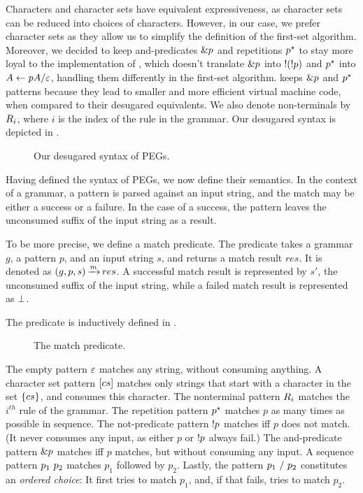 Characters and character sets
have equivalent expressiveness,
as character sets can be reduced into choices of characters.
However, in our case, we prefer character sets as they allow us to
simplify the definition of the first-set algorithm.
Moreover, we decided to keep and-predicates $\&p$
and repetitions $p^\star$
to stay more loyal to the implementation of \lpeg{},
which doesn't translate $\&p$ into $!(!p)$
and $p^\star$ into $A \leftarrow pA/\varepsilon{}$,
handling them differently in the first-set algorithm.
\lpeg{} keeps $\&p$ and $p^\star$ patterns
because they lead to smaller and more efficient virtual machine code,
when compared to their desugared equivalents.
We also denote non-terminals by $R_{i}$,
where $i$ is the index of the rule in the grammar.
Our desugared syntax is depicted in .
\begin{figure}[t]
    \centering
    
    \caption{Our desugared syntax of PEGs.}
    \label{fig:syntax}
\end{figure}

Having defined the syntax of PEGs,
we now define their semantics.
In the context of a grammar,
a pattern is parsed against an input string,
and the match may be either a success or a failure.
In the case of a success,
the pattern leaves the unconsumed suffix
of the input string as a result.

To be more precise,
we define a match predicate.
The predicate
takes a grammar $g$,
a pattern $p$,
and an input string $s$,
and returns a match result $res$.
It is denoted as $(g,p,s) \operatorname{\xrightarrow{\mathit{m}}} res$.
A successful match result is represented by $s'$,
the unconsumed suffix of the input string,
while a failed match result is represented as $\operatorname{\bot}$.

The predicate is inductively defined in .
\begin{figure}
    
    \caption{The match predicate.}
    \label{fig:match}
\end{figure}
The empty pattern $\varepsilon$
matches any string,
without consuming anything.
A character set pattern ${[cs]}$
matches only strings that start with a character in the set $\{cs\}$,
and consumes this character.
The nonterminal pattern ${R_{i}}$
matches the ${i^{th}}$ rule of the grammar.
The repetition pattern ${p^\star}$
matches $p$ as many times as possible
in sequence.
The not-predicate pattern ${!p}$ matches
iff $p$ does not match.
(It never consumes any input,
as either $p$ or ${!p}$ always fail.)
The and-predicate pattern ${\&p}$ matches
iff $p$ matches,
but without consuming any input.
A sequence pattern ${p_1\ p_2}$
matches $p_1$ followed by $p_2$.
Lastly, the pattern ${p_1\ /\ p_2}$
constitutes an \emph{ordered choice}:
It first tries to match $p_1$,
and, if that fails, tries to match $p_2$.

